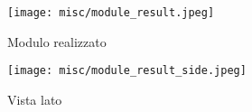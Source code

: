 \begin{figure}[H]
    \centering

    \begin{subfigure}{.4\textwidth}
        \centering
        \texttt{[image: misc/module\_result.jpeg]}
        \caption{Modulo realizzato}
        \label{module_result}
    \end{subfigure}%
    \begin{subfigure}{.4\textwidth}
        \centering
        \texttt{[image: misc/module\_result\_side.jpeg]}
        \caption{Vista lato}
        \label{module_result_side}
    \end{subfigure}

    \caption*{}
\end{figure}

